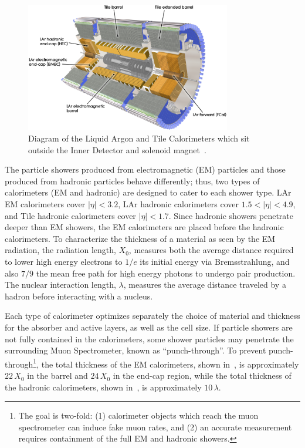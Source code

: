 \begin{figure}[tbp]
\begin{center}
\includegraphics[width=0.8\textwidth]{figures/ATLAS/calorimeter_layout}
\caption[Layout of Liquid Argon and Tile calorimters]{Diagram of the Liquid Argon and Tile Calorimeters which sit outside the Inner Detector and solenoid magnet~\cite{ATLAS}.}
\label{fig:cal_layout}
\end{center}
\end{figure}

The particle showers produced from electromagnetic (EM) particles and those produced from hadronic particles behave differently; thus, two types of calorimeters (EM and hadronic) are designed to cater to each  shower type. LAr EM calorimeters cover $|\eta|<3.2$, LAr hadronic calorimeters cover $1.5<|\eta|<4.9$, and Tile hadronic calorimeters cover $|\eta|<1.7$. Since hadronic showers penetrate deeper than EM showers, the EM calorimeters are placed before the hadronic calorimeters. To characterize the thickness of a material as seen by the EM radiation, the radiation length, $X_0$, measures both the average distance required to lower high energy electrons to $1/e$ its initial energy via Bremsstrahlung, and also $7/9$ the mean free path for high energy photons to undergo pair production. The nuclear interaction length, $\lambda$, measures the average distance traveled by a hadron before interacting with a nucleus.

Each type of calorimeter optimizes separately the choice of material and thickness for the absorber and active layers, as well as the cell size. If particle showers are not fully contained in the calorimeters, some shower particles may penetrate the surrounding Muon Spectrometer, known as ``punch-through''. To prevent punch-through\footnote{
	The goal is two-fold: (1) calorimeter objects which reach the muon spectrometer can induce fake muon rates, and (2) an accurate \MET measurement requires containment of the full EM and hadronic showers.
}, the total thickness of the EM calorimeters, shown in~\Fig{\ref{fig:x0_cal}}, is approximately $22\,X_0$ in the barrel and $24\,X_0$ in the end-cap region, while the total thickness of the hadronic calorimeters, shown in~\Fig{\ref{fig:lambda_cal}}, is approximately $10\,\lambda$. 

